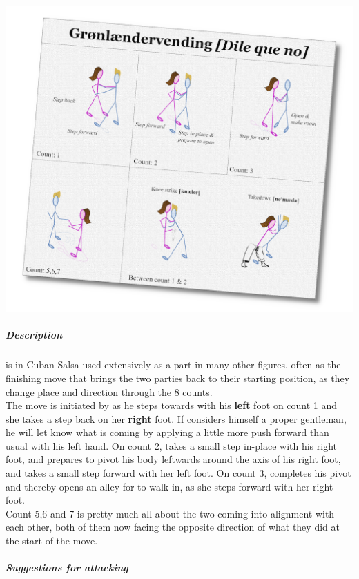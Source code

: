 \section*{\Sovsdile [\Salsadile]}
\begin{center}
\includegraphics[scale=0.15]{02-Description/diagram-dile-que-no-present}
\end{center}
\subparagraph*{Description}
\Salsadile is in Cuban Salsa used extensively as a part in many other figures, often as the finishing move that brings the two parties back to their starting position, as they change place and direction through the 8 counts. \\
The move is initiated by \dude as he steps towards \gal with his \textbf{left} foot on count 1 and she takes a step back on her \textbf{right} foot. If \dude considers himself a proper gentleman, he will let \gal know what is coming by applying a little more push forward than usual with his left hand. On count 2, \dude takes a small step in-place with his right foot, and prepares to pivot his body leftwards around the axis of his right foot, and \gal takes a small step forward with her left foot. On count 3, \dude completes his pivot and thereby opens an alley for \gal to walk in, as she steps forward with her right foot. \\
Count 5,6 and 7 is pretty much all about the two coming into alignment with each other, both of them now facing the opposite direction of what they did at the start of the move. 
\subparagraph*{Suggestions for attacking}
